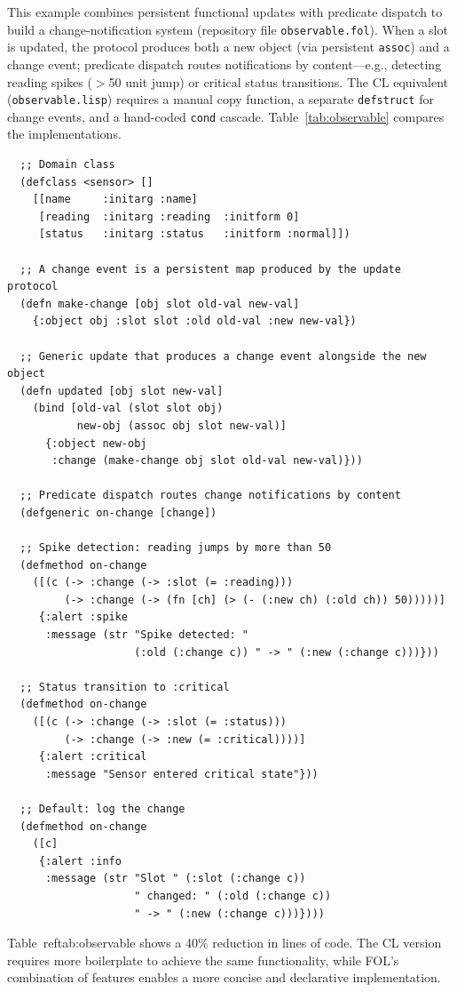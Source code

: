 \documentclass[sigconf,nonacm,review]{acmart}
\begin{document}
This example combines persistent functional updates with predicate dispatch to build a change-notification system (repository file \texttt{observable.fol}). When a slot is updated, the protocol produces both a new
object (via persistent \texttt{assoc}) and a change event; predicate dispatch routes notifications by content---e.g., detecting reading spikes ($>$50 unit jump) or critical status transitions. The CL equivalent
(\texttt{observable.lisp}) requires a manual copy function, a separate \texttt{defstruct} for change events, and a hand-coded \texttt{cond} cascade. Table~\ref{tab:observable} compares the implementations.
\begin{lstlisting}
  ;; Domain class
  (defclass <sensor> []
    [[name     :initarg :name]
     [reading  :initarg :reading  :initform 0]
     [status   :initarg :status   :initform :normal]])

  ;; A change event is a persistent map produced by the update protocol
  (defn make-change [obj slot old-val new-val]
    {:object obj :slot slot :old old-val :new new-val})

  ;; Generic update that produces a change event alongside the new object
  (defn updated [obj slot new-val]
    (bind [old-val (slot slot obj)
           new-obj (assoc obj slot new-val)]
      {:object new-obj
       :change (make-change obj slot old-val new-val)}))

  ;; Predicate dispatch routes change notifications by content
  (defgeneric on-change [change])

  ;; Spike detection: reading jumps by more than 50
  (defmethod on-change
    ([(c (-> :change (-> :slot (= :reading)))
         (-> :change (-> (fn [ch] (> (- (:new ch) (:old ch)) 50)))))]
     {:alert :spike
      :message (str "Spike detected: "
                    (:old (:change c)) " -> " (:new (:change c)))}))

  ;; Status transition to :critical
  (defmethod on-change
    ([(c (-> :change (-> :slot (= :status)))
         (-> :change (-> :new (= :critical))))]
     {:alert :critical
      :message "Sensor entered critical state"}))

  ;; Default: log the change
  (defmethod on-change
    ([c]
     {:alert :info
      :message (str "Slot " (:slot (:change c))
                    " changed: " (:old (:change c))
                    " -> " (:new (:change c)))})))
\end{lstlisting}
Table~ref{{tab:observable}} shows a 40\% reduction in lines of code. The CL version requires more boilerplate to achieve the same functionality, while FOL's combination of features enables a more concise and declarative implementation.
\end{document}
